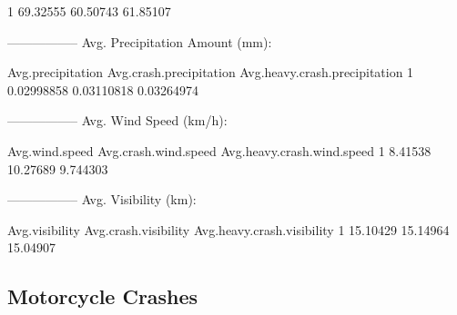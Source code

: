 \documentclass[11pt, a4paper]{article}
\begin{document}
\begin{Schunk}
\begin{Soutput}
1     69.32555           60.50743                 61.85107
\end{Soutput}
\begin{Soutput}
-----------------
Avg. Precipitation Amount (mm):
\end{Soutput}
\begin{Soutput}
  Avg.precipitation Avg.crash.precipitation Avg.heavy.crash.precipitation
1        0.02998858              0.03110818                    0.03264974
\end{Soutput}
\begin{Soutput}
-----------------
Avg. Wind Speed (km/h):
\end{Soutput}
\begin{Soutput}
  Avg.wind.speed Avg.crash.wind.speed Avg.heavy.crash.wind.speed
1        8.41538             10.27689                   9.744303
\end{Soutput}
\begin{Soutput}
-----------------
Avg. Visibility (km):
\end{Soutput}
\begin{Soutput}
  Avg.visibility Avg.crash.visibility Avg.heavy.crash.visibility
1       15.10429             15.14964                   15.04907
\end{Soutput}
\end{Schunk}



\pagebreak
\subsection{Motorcycle Crashes}
\end{document}
